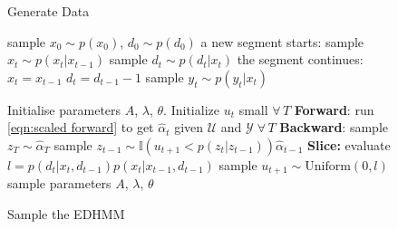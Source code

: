 \begin{figure*}[ttt!]
\begin{minipage}[t]{2in}
\begin{algorithm}[H]
    \caption{Generate Data}
    \label{alg:gen}
    \begin{algorithmic}
        \STATE sample $x_0 \sim p(x_0)$, $d_0 \sim p(d_0)$
                \STATE a new segment starts:
                \STATE sample $x_t \sim p(x_t | x_{t-1})$
                \STATE sample $d_t \sim p(d_t | x_t)$
            \ELSE
                \STATE the segment continues:
                \STATE $x_t = x_{t-1}$
                \STATE $d_t = d_{t-1} - 1$
            \ENDIF
        \STATE sample $y_t \sim p(y_t | x_t)$
        \ENDFOR
    \end{algorithmic}
\end{algorithm} 
 \end{minipage}
 \hfill
 \begin{minipage}[t]{3.3in}
\begin{algorithm}[H]
    \caption{Sample the EDHMM}
    \label{alg:beam}
    \begin{algorithmic}
\STATE Initialise parameters $A$, $\lambda$, $\theta.$ Initialize $u_t$ small $\forall\, T$
    \STATE \textbf{Forward}: run \eqref{eqn:scaled forward} to get $\hat{\alpha}_t$ given $\mathcal{U}$ and $\mathcal{Y} \; \forall\, T$
    \STATE \textbf{Backward}: sample $z_T \sim \hat{\alpha}_T$
        \STATE sample $z_{t-1} \sim \mathbb{I}(u_{t+1} < p(z_{t} | z_{t-1}))\hat{\alpha}_{t-1}$
    \ENDFOR
\STATE \textbf{Slice:}
    \STATE evaluate $l = p(d_t|x_t,d_{t-1})p(x_t|x_{t-1},d_{t-1})$
    \STATE sample $u_{t+1} \sim \mathrm{Uniform}(0,l)$
    \ENDFOR
\STATE sample parameters $A$, $\lambda$, $\theta$
\ENDFOR
\end{algorithmic}
\end{algorithm}
\end{minipage}
 \hfill
\end{figure*}